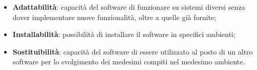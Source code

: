 \begin{itemize}
	\item \textbf{Adattabilità}: capacità del software di funzionare su sistemi diversi senza dover implementare nuove funzionalità, oltre a quelle già fornite;
	\item \textbf{Installabilità}: possibilità di installare il software in specifici ambienti;
	\item \textbf{Sostituibilità}: capacità del software di essere utilizzato al posto di un altro software per lo svolgimento dei medesimi compiti nel medesimo ambiente.
\end{itemize}
























































